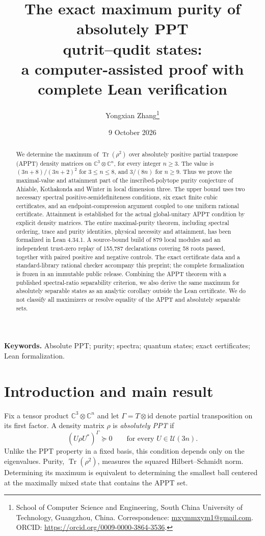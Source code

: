\documentclass[11pt]{article}
\title{The exact maximum purity of absolutely PPT\protect\\qutrit--qudit states:\protect\\a computer-assisted proof with complete Lean verification}
\author{Yongxian Zhang\thanks{School of Computer Science and Engineering, South China University of Technology, Guangzhou, China. Correspondence: \href{mailto:mxymmxym1@gmail.com}{mxymmxym1@gmail.com}. ORCID: \url{https://orcid.org/0009-0000-3864-3536}.}}
\date{9 October 2026}
\theoremstyle{remark}\newtheorem{remark}[theorem]{Remark}
\newcommand{\Tr}{\operatorname{Tr}}
\newcommand{\id}{\mathrm{id}}
\newcommand{\C}{\mathbb C}
\begin{document}
\maketitle
\begin{abstract}
We determine the maximum of $\Tr(\rho^2)$ over absolutely positive partial transpose (APPT) density matrices on $\C^3\otimes\C^n$, for every integer $n\geq3$. The value is $(3n+8)/(3n+2)^2$ for $3\leq n\leq8$, and $3/(8n)$ for $n\geq9$. Thus we prove the maximal-value and attainment part of the inscribed-polytope purity conjecture of Ahiable, Kothakonda and Winter in local dimension three. The upper bound uses two necessary spectral positive-semidefiniteness conditions, six exact finite cubic certificates, and an endpoint-compression argument coupled to one uniform rational certificate. Attainment is established for the actual global-unitary APPT condition by explicit density matrices. The entire maximal-purity theorem, including spectral ordering, trace and purity identities, physical necessity and attainment, has been formalized in Lean 4.34.1. A source-bound build of 879 local modules and an independent trust-zero replay of 155,787 declarations covering 58 roots passed, together with paired positive and negative controls. The exact certificate data and a standard-library rational checker accompany this preprint; the complete formalization is frozen in an immutable public release. Combining the APPT theorem with a published spectral-ratio separability criterion, we also derive the same maximum for absolutely separable states as an analytic corollary outside the Lean certificate. We do not classify all maximizers or resolve equality of the APPT and absolutely separable sets.
\end{abstract}
\noindent\textbf{Keywords.} Absolute PPT; purity; spectra; quantum states; exact certificates; Lean formalization.

\section{Introduction and main result}
Fix a tensor product $\C^3\otimes\C^n$ and let $\Gamma=T\otimes\id$ denote partial transposition on its first factor. A density matrix $\rho$ is \emph{absolutely PPT} if
\begin{equation}\label{eq:appt}
 (U\rho U^*)^\Gamma\succeq0\qquad\text{for every }U\in\mathcal U(3n).
\end{equation}
Unlike the PPT property in a fixed basis, this condition depends only on the eigenvalues. Purity, $\Tr(\rho^2)$, measures the squared Hilbert--Schmidt norm. Determining its maximum is equivalent to determining the smallest ball centered at the maximally mixed state that contains the APPT set.
\end{document}
